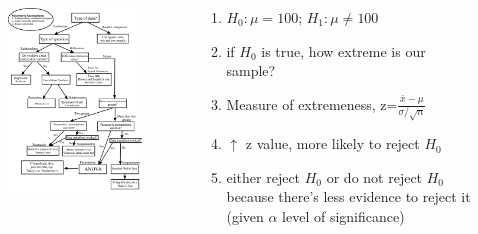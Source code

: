 \documentclass{beamer}
\begin{document}
\begin{frame}[plain]
\begin{columns}
	\begin{column}{0.72\textwidth}
		\begin{figure}
			\includegraphics[scale=0.54]{statisticaltest}
		\end{figure}
	\end{column}
	\begin{column}{0.3\textwidth}
		\begin{enumerate}
			\item $H_0: \mu=100$; $H_1: \mu \ne 100$
			\item if $H_0$ is true, how extreme is our sample?
			\item Measure of extremeness, z=$\frac{\bar{x}-\mu}{\sigma/\sqrt{n}}$
			\item $\uparrow$ z value, more likely to reject $H_0$
			\item either reject $H_0$ or do not reject $H_0$ because there's less evidence to reject it (given $\alpha$ level of significance)
		\end{enumerate}
	\end{column}
\end{columns}
\end{frame}
\end{document}
